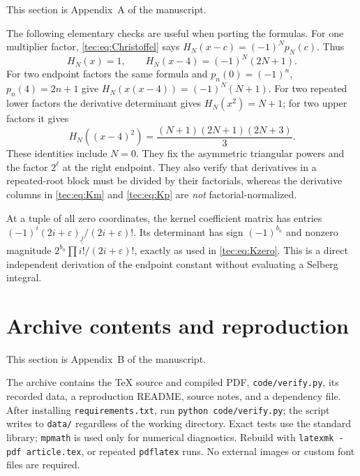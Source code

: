 \documentclass[11pt,a4paper]{article}
\numberwithin{equation}{section}
\theoremstyle{definition}
\theoremstyle{remark}
\newcommand{\fall}[2]{(#1)_{\underline{#2}}}
\begin{document}
This section is Appendix~A of the manuscript.

The following elementary checks are useful when porting the formulas.
For one multiplier factor, \eqref{tec:eq:Christoffel} says
$H_N(x-c)=(-1)^Np_N(c)$. Thus
\[
 H_N(x)=1,\qquad H_N(x-4)=(-1)^N(2N+1).
\]
For two endpoint factors the same formula and
$p_n(0)=(-1)^n$, $p_n(4)=2n+1$ give
$H_N(x(x-4))=(-1)^N(N+1)$.
For two repeated lower factors the derivative determinant gives
$H_N(x^2)=N+1$; for two upper factors it gives
\[
 H_N((x-4)^2)=\frac{(N+1)(2N+1)(2N+3)}3.
\]
These identities include $N=0$. They fix the asymmetric triangular
powers and the factor $2^\ell$ at the right endpoint. They also verify
that derivatives in a repeated-root block must be divided by their
factorials, whereas the derivative columns in \eqref{tec:eq:Km} and
\eqref{tec:eq:Kp} are \emph{not} factorial-normalized.

At a tuple of all zero coordinates, the kernel coefficient matrix has
entries $(-1)^i\fall{2i+\varepsilon}{j}/(2i+\varepsilon)!$.
Its determinant has sign $(-1)^{b_n}$ and nonzero magnitude
$2^{b_n}\prod i!/(2i+\varepsilon)!$, exactly as used in
\eqref{tec:eq:Kzero}. This is a direct independent derivation of the
endpoint constant without evaluating a Selberg integral.

\section{Archive contents and reproduction}\label{tec:app:archive}

This section is Appendix~B of the manuscript.

The archive contains the TeX source and compiled PDF, \texttt{code/verify.py},
its recorded data, a reproduction README, source notes, and a dependency
file. After installing \texttt{requirements.txt}, run
\texttt{python code/verify.py}; the script writes to \texttt{data/}
regardless of the working directory. Exact tests use the standard library;
\texttt{mpmath} is used only for numerical diagnostics. Rebuild with
\texttt{latexmk -pdf article.tex}, or repeated \texttt{pdflatex} runs.
No external images or custom font files are required.
\end{document}
